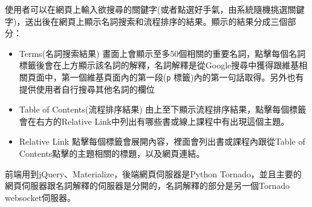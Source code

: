 使用者可以在網頁上輸入欲搜尋的關鍵字(或者點選好手氣，由系統隨機挑選關鍵字)，送出後在網頁上顯示名詞搜索和流程排序的結果。顯示的結果分成三個部分：
\begin{itemize}
	\item Terms(名詞搜索結果)
		畫面上會顯示至多50個相關的重要名詞，點擊每個名詞標籤後會在上方顯示該名詞的解釋，名詞解釋是從Google搜尋中獲得跟維基相關頁面中，第一個維基頁面內的第一段(\texttt{p} 標籤)內的第一句話取得。另外也有提供使用者自行搜尋其他名詞的欄位
	\item Table of Contents(流程排序結果)
		由上至下顯示流程排序結果，點擊每個標籤會在右方的Relative Link中列出有哪些書或線上課程中有出現這個主題。
	\item Relative Link
		點擊每個標籤會展開內容，裡面會列出書或課程內跟從Table of Contents點擊的主題相關的標題，以及網頁連結。
\end{itemize}

前端用到jQuery、Materialize，後端網頁伺服器是Python Tornado，並且主要的網頁伺服器跟名詞解釋的伺服器是分開的，名詞解釋的部分是另一個Tornado websocket伺服器。